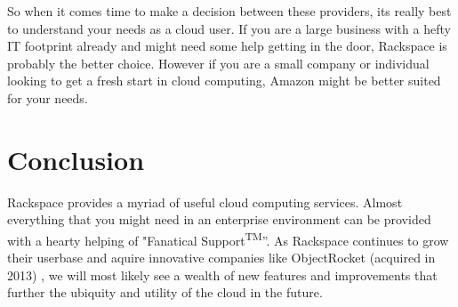 \documentclass[DIV=calc, paper=letter, fontsize=12pt, twocolumn]{scrartcl}	 %
\begin{document}
So when it comes time to make a decision
between these providers, its really best to understand your needs as
a cloud user. If you are a large business with a hefty IT footprint
already and might need some help getting in the door, Rackspace is probably
the better choice. However if you are a small company or individual
looking to get a fresh start in cloud computing, Amazon might be better
suited for your needs.

\section*{Conclusion}

Rackspace provides a myriad of useful cloud computing services. Almost everything
that you might need in an enterprise environment can be provided with a hearty
helping of "Fanatical Support\textsuperscript{TM}''. As Rackspace continues to 
grow their userbase and aquire innovative companies like ObjectRocket (acquired in 2013)
\cite{ref:objectrocket}, we will most likely see a wealth of new features and
improvements that further the ubiquity and utility of the cloud in the future.

\vfill




\pagebreak




 

\end{document}
